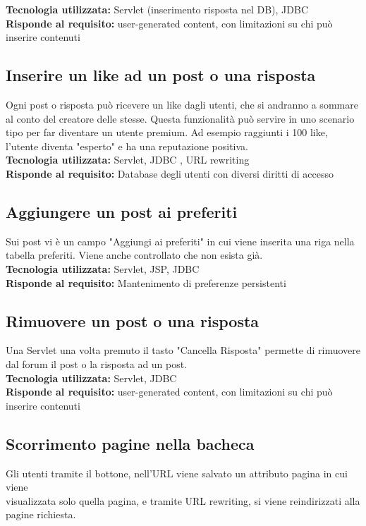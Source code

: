 \documentclass{article} %
\begin{document}
    \textbf{Tecnologia utilizzata:} Servlet (inserimento risposta nel DB), JDBC \\
    \textbf{Risponde al requisito:} user-generated content, con limitazioni su chi può inserire contenuti

    \subsection{Inserire un like ad un post o una risposta}
    Ogni post o risposta può ricevere un like dagli utenti, che si andranno a sommare
    al conto del creatore delle stesse. Questa funzionalità può servire in uno scenario tipo per far diventare
    un utente premium. Ad esempio raggiunti i 100 like, l'utente diventa "esperto" e ha una reputazione
    positiva. \\
    
    \textbf{Tecnologia utilizzata:} Servlet, JDBC , URL rewriting \\
    \textbf{Risponde al requisito:} Database degli utenti con diversi diritti di accesso

    \subsection{Aggiungere un post ai preferiti}
    Sui post vi è un campo "Aggiungi ai preferiti" in cui viene inserita una riga nella tabella preferiti.
    Viene anche controllato che non esista già. \\
    
    \textbf{Tecnologia utilizzata:} Servlet, JSP, JDBC \\
    \textbf{Risponde al requisito:} Mantenimento di preferenze persistenti \\

    \subsection{Rimuovere un post o una risposta}
    Una Servlet una volta premuto il tasto "Cancella Risposta" permette di rimuovere dal forum
    il post o la risposta ad un post. \\

    \textbf{Tecnologia utilizzata:} Servlet, JDBC \\
    \textbf{Risponde al requisito:} user-generated content, con limitazioni su chi può inserire contenuti

    \subsection{Scorrimento pagine nella bacheca}
    Gli utenti tramite il bottone, nell'URL viene salvato un attributo pagina in cui viene \\
    visualizzata solo quella pagina, e tramite URL rewriting, si viene reindirizzati alla pagine richiesta.\\
    
\end{document}
